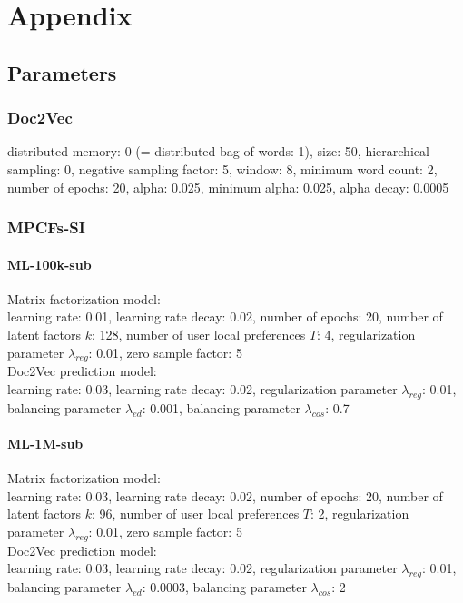 \chapter{Appendix}
\label{a:appendix}

\section{Parameters}
\label{a:best-params}

\subsection{Doc2Vec}
\label{a:doc2vec}
distributed memory: 0 (= distributed bag-of-words: 1), size: 50, hierarchical sampling: 0, negative sampling factor: 5, window: 8, minimum word count: 2, number of epochs: 20, alpha: 0.025, minimum alpha: 0.025, alpha decay: 0.0005

\subsection{MPCFs-SI}
\subsubsection{ML-100k-sub}
Matrix factorization model:\\
learning rate: 0.01, learning rate decay: 0.02, number of epochs: 20, number of latent factors $k$: 128, number of user local preferences $T$: 4, regularization parameter $\lambda_{reg}$: 0.01, zero sample factor: 5\\
Doc2Vec prediction model:\\
learning rate: 0.03, learning rate decay: 0.02, regularization parameter $\lambda_{reg}$: 0.01, balancing parameter $\lambda_{ed}$: 0.001, balancing parameter $\lambda_{cos}$: 0.7

\subsubsection{ML-1M-sub}
Matrix factorization model:\\
learning rate: 0.03, learning rate decay: 0.02, number of epochs: 20, number of latent factors $k$: 96, number of user local preferences $T$: 2, regularization parameter $\lambda_{reg}$: 0.01, zero sample factor: 5\\
Doc2Vec prediction model:\\
learning rate: 0.03, learning rate decay: 0.02, regularization parameter $\lambda_{reg}$: 0.01, balancing parameter $\lambda_{ed}$: 0.0003, balancing parameter $\lambda_{cos}$: 2

